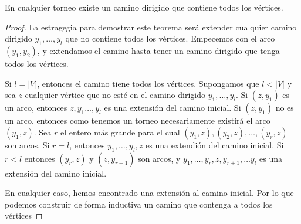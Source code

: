 \begin{teo}
    En cualquier torneo existe un camino dirigido que contiene todos los vértices.
\end{teo}

\begin{proof}
    La estragegia para demostrar este teorema será extender cualquier camino dirigido $y_1, \dots, y_l$ que no contiene todos los vértices. Empecemos con el arco $(y_1, y_2)$, y extendamos el camino hasta tener un camino dirigido que tenga todos los vértices.
    
    Si $l = |V|$, entonces el camino tiene todos los vértices. Supongamos que $l < |V|$ y sea $z$ cualquier vértice que no esté en el camino dirigido $y_1, \dots, y_l$. Si $(z, y_1)$ es un arco, entonces $z, y_1 \dots, y_l$ es una extensión del camino inicial. Si $(z, y_1)$ no es un arco, entonces como tenemos un torneo necesariamente existirá el arco $(y_1, z)$. Sea $r$ el entero más grande para el cual $(y_1, z), (y_2, z), \dots, (y_r, z)$ son arcos. Si $r=l$, entonces $y_1, \dots, y_l, z$ es una extendión del camino inicial. Si $r<l$ entonces $(y_r, z)$ y $(z, y_{r+1})$ son arcos, y $y_1, \dots, y_r, z, y_{r+1}, \dots y_l$ es una extensión del camino inicial.
    
    En cualquier caso, hemos encontrado una extensión al camino inicial. Por lo que podemos construir de forma inductiva un camino que contenga a todos los vértices
\end{proof}